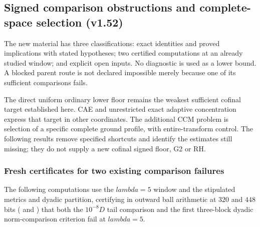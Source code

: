 \documentclass[11pt]{article}
\def\lambda{lambda}%
\theoremstyle{remark}
\begin{document}
\subsection{Signed comparison obstructions and complete-space selection (v1.52)}
\label{sec:v152-route-selection}
The new material has three classifications: exact identities and proved
implications with stated hypotheses; two certified computations at an
already studied window; and explicit open inputs. No diagnostic is used
as a lower bound. A blocked parent route is not declared impossible
merely because one of its sufficient comparisons fails.

The direct uniform ordinary lower floor remains the weakest sufficient
cofinal target established here. CAE and unrestricted exact adaptive
concentration express that target in other coordinates. The additional
CCM problem is selection of a specific complete ground profile, with
entire-transform control. The following results remove specified
shortcuts and identify the estimates still missing; they do not supply
a new cofinal signed floor, G2 or RH.



\subsubsection{Fresh certificates for two existing comparison failures}

The following computations use the $\lambda=5$ window and the stipulated metrics and dyadic partition, certifying in outward ball arithmetic at $320$ and $448$ bits ( and ) that both the $10^{-8}D$ tail comparison and the first three-block dyadic norm-comparison criterion fail at $\lambda=5$.
\end{document}
